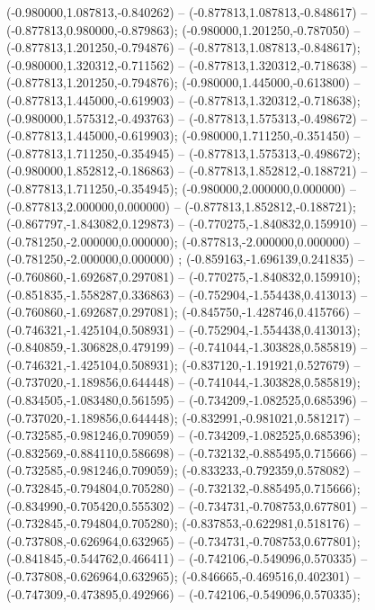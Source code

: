  (-0.980000,1.087813,-0.840262) -- (-0.877813,1.087813,-0.848617) -- (-0.877813,0.980000,-0.879863);
 (-0.980000,1.201250,-0.787050) -- (-0.877813,1.201250,-0.794876) -- (-0.877813,1.087813,-0.848617);
 (-0.980000,1.320312,-0.711562) -- (-0.877813,1.320312,-0.718638) -- (-0.877813,1.201250,-0.794876);
 (-0.980000,1.445000,-0.613800) -- (-0.877813,1.445000,-0.619903) -- (-0.877813,1.320312,-0.718638);
 (-0.980000,1.575312,-0.493763) -- (-0.877813,1.575313,-0.498672) -- (-0.877813,1.445000,-0.619903);
 (-0.980000,1.711250,-0.351450) -- (-0.877813,1.711250,-0.354945) -- (-0.877813,1.575313,-0.498672);
 (-0.980000,1.852812,-0.186863) -- (-0.877813,1.852812,-0.188721) -- (-0.877813,1.711250,-0.354945);
 (-0.980000,2.000000,0.000000) -- (-0.877813,2.000000,0.000000) -- (-0.877813,1.852812,-0.188721);
 (-0.867797,-1.843082,0.129873) -- (-0.770275,-1.840832,0.159910) -- (-0.781250,-2.000000,0.000000);
 (-0.877813,-2.000000,0.000000) -- (-0.781250,-2.000000,0.000000) ;
 (-0.859163,-1.696139,0.241835) -- (-0.760860,-1.692687,0.297081) -- (-0.770275,-1.840832,0.159910);
 (-0.851835,-1.558287,0.336863) -- (-0.752904,-1.554438,0.413013) -- (-0.760860,-1.692687,0.297081);
 (-0.845750,-1.428746,0.415766) -- (-0.746321,-1.425104,0.508931) -- (-0.752904,-1.554438,0.413013);
 (-0.840859,-1.306828,0.479199) -- (-0.741044,-1.303828,0.585819) -- (-0.746321,-1.425104,0.508931);
 (-0.837120,-1.191921,0.527679) -- (-0.737020,-1.189856,0.644448) -- (-0.741044,-1.303828,0.585819);
 (-0.834505,-1.083480,0.561595) -- (-0.734209,-1.082525,0.685396) -- (-0.737020,-1.189856,0.644448);
 (-0.832991,-0.981021,0.581217) -- (-0.732585,-0.981246,0.709059) -- (-0.734209,-1.082525,0.685396);
 (-0.832569,-0.884110,0.586698) -- (-0.732132,-0.885495,0.715666) -- (-0.732585,-0.981246,0.709059);
 (-0.833233,-0.792359,0.578082) -- (-0.732845,-0.794804,0.705280) -- (-0.732132,-0.885495,0.715666);
 (-0.834990,-0.705420,0.555302) -- (-0.734731,-0.708753,0.677801) -- (-0.732845,-0.794804,0.705280);
 (-0.837853,-0.622981,0.518176) -- (-0.737808,-0.626964,0.632965) -- (-0.734731,-0.708753,0.677801);
 (-0.841845,-0.544762,0.466411) -- (-0.742106,-0.549096,0.570335) -- (-0.737808,-0.626964,0.632965);
 (-0.846665,-0.469516,0.402301) -- (-0.747309,-0.473895,0.492966) -- (-0.742106,-0.549096,0.570335);
